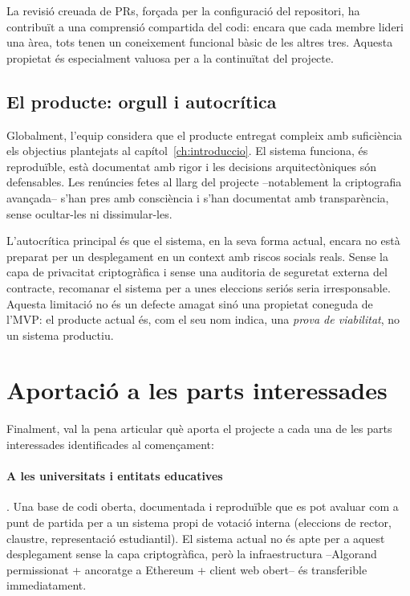 La revisió creuada de \acsp{PR}, forçada per la configuració del repositori, ha contribuït a una comprensió compartida
del codi: encara que cada membre lideri una àrea, tots tenen un coneixement funcional bàsic de les altres tres.
Aquesta propietat és especialment valuosa per a la continuïtat del projecte.

\subsection{El producte: orgull i autocrítica}
\label{subsec:el-producte:-orgull-i-autocritica}

Globalment, l'equip considera que el producte entregat compleix amb suficiència els objectius plantejats al
capítol~\ref{ch:introduccio}.
El sistema funciona, és reproduïble, està documentat amb rigor i les decisions arquitectòniques són defensables.
Les renúncies fetes al llarg del projecte --notablement la criptografia avançada-- s'han pres amb consciència i s'han
documentat amb transparència, sense ocultar-les ni dissimular-les.

L'autocrítica principal és que el sistema, en la seva forma actual, encara no està preparat per un desplegament en un
context amb riscos socials reals.
Sense la capa de privacitat criptogràfica i sense una auditoria de seguretat externa del contracte, recomanar el sistema
per a unes eleccions seriós seria irresponsable.
Aquesta limitació no és un defecte amagat sinó una propietat coneguda de l'\ac{MVP}: el producte actual és, com el seu
nom indica, una \emph{prova de viabilitat}, no un sistema productiu.



\section{Aportació a les parts interessades}
\label{sec:aportacio-stakeholders}

Finalment, val la pena articular què aporta el projecte a cada una de les parts interessades identificades al
començament:

\paragraph{A les universitats i entitats educatives}.
Una base de codi oberta, documentada i reproduïble que es pot avaluar com a punt de partida per a un sistema propi de
votació interna (eleccions de rector, claustre, representació estudiantil).
El sistema actual no és apte per a aquest desplegament sense la capa criptogràfica, però la infraestructura --Algorand
permissionat + ancoratge a Ethereum + client web obert-- és transferible immediatament.

